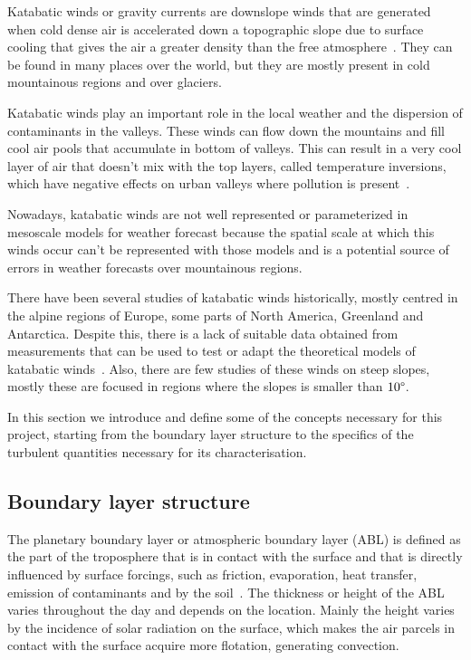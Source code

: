 Katabatic winds or gravity currents are downslope winds that are generated when cold dense air is accelerated down a topographic slope due to surface cooling that gives the air a greater density than the free atmosphere~\citep{poulos2008observational}. They can be found in many places over the world, but they are mostly present in cold mountainous regions and over glaciers. 

Katabatic winds play an important role in the local weather and the dispersion of contaminants in the valleys. These winds can flow down the mountains and fill cool air pools that accumulate in bottom of valleys. This can result in a very cool layer of air that doesn't mix with the top layers, called temperature inversions, which have negative effects on urban valleys where pollution is present~\citep{largeron2016persistent}.

Nowadays, katabatic winds are not well represented or parameterized in mesoscale models for weather forecast because the spatial scale at which this winds occur can't be represented with those models and is a potential source of errors in weather forecasts over mountainous regions. 

There have been several studies of katabatic winds historically, mostly centred in the alpine regions of Europe, some parts of North America, Greenland and Antarctica. Despite this, there is a lack of suitable data obtained from measurements that can be used to test or adapt the theoretical models of katabatic winds~\citep{manins1979katabatic}. Also, there are few studies of these winds on steep slopes, mostly these are focused in regions where the slopes is smaller than $10 \degree$.

In this section we introduce and define some of the concepts necessary for this project, starting from the boundary layer structure to the specifics of the turbulent quantities necessary for its characterisation.

\subsection{Boundary layer structure}
The planetary boundary layer or atmospheric boundary layer (ABL) is defined as the part of the troposphere that is in contact with the surface and that is directly influenced by surface forcings, such as friction, evaporation, heat transfer, emission of contaminants and by the soil~\citep{stull2012introduction}. The thickness or height of the ABL varies throughout the day and depends on the location. Mainly the height varies by the incidence of solar radiation on the surface, which makes the air parcels in contact with the surface acquire more flotation, generating convection.

